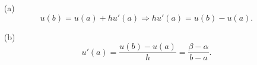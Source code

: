 \documentclass[a4paper]{book}
\makeatletter
\newenvironment{sol}[1][\solname]{\par
  \pushQED{\qed}
  \normalfont \topsep6\p@\@plus6\p@\relax
  \trivlist
  \item[\hskip\labelsep
        \itshape
    #1\@addpunct{.}]\ignorespaces
}{\popQED\endtrivlist\@endpefalse}
\providecommand{\solname}{Solution}
\numberwithin{equation}{chapter}
\theoremstyle{definition}
\makeatother
\begin{document}
  \begin{sol}
    \begin{itemize}
    \item[(a)]
      \begin{displaymath}
        u(b) = u(a) + hu'(a) \Rightarrow hu'(a) = u(b)-u(a).
      \end{displaymath}
  
    \item[(b)]
      \begin{displaymath}
        u'(a) = \frac{u(b)-u(a)}{h} = \frac{\beta-\alpha}{b-a}.
      \end{displaymath}
    \end{itemize}
  \end{sol}
\end{document}
